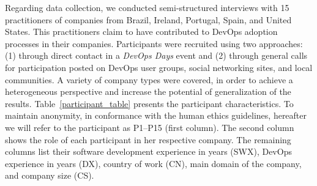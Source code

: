 
Regarding data collection, we conducted semi-structured interviews with 15 practitioners of companies from
Brazil, Ireland, Portugal, Spain, and United States. This practitioners claim
to have contributed to DevOps adoption processes in their companies. Participants
were recruited using two approaches: (1) through direct contact in a \emph{DevOps Days} 
event and (2) through  general
calls for participation posted on DevOps user groups, social networking sites,
and local communities. A variety of company types were covered, in order to
achieve a heterogeneous perspective and increase the potential of generalization
of the results. Table~\ref{participant_table} presents the participant
characteristics. 
To maintain anonymity, in conformance with the human ethics guidelines,
hereafter we will refer to the participant as P1--P15 (first column).
The second column shows the role of
each participant in her respective company. The remaining columns list their
software development experience in years (SWX), DevOps experience in years (DX),
country of work (CN), main domain of the company, and company size (CS).


